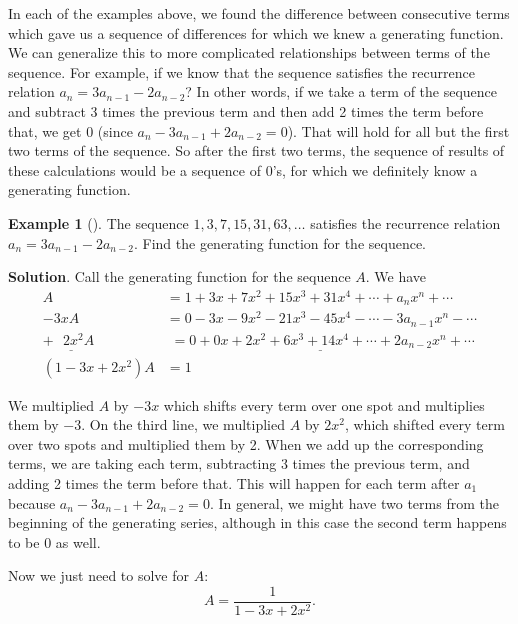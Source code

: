 \documentclass[10pt,]{book}
\theoremstyle{plain}
\theoremstyle{definition}
\theoremstyle{definition}
\newtheorem{example}[theorem]{Example}
\theoremstyle{definition}
\theoremstyle{definition}
\numberwithin{equation}{chapter}
\newcommand{\amp}{&}
\begin{document}
\hypertarget{p-988}{}%
In each of the examples above, we found the difference between consecutive terms which gave us a sequence of differences for which we knew a generating function. We can generalize this to more complicated relationships between terms of the sequence. For example, if we know that the sequence satisfies the recurrence relation \(a_n = 3a_{n-1} - 2a_{n-2}\)? In other words, if we take a term of the sequence and subtract 3 times the previous term and then add 2 times the term before that, we get 0 (since \(a_n - 3a_{n-1} + 2a_{n-2} = 0\)). That will hold for all but the first two terms of the sequence. So after the first two terms, the sequence of results of these calculations would be a sequence of 0's, for which we definitely know a generating function.%
\begin{example}[]\label{example-25}
\hypertarget{p-989}{}%
The sequence \(1, 3, 7, 15, 31, 63, \ldots\) satisfies the recurrence relation \(a_n = 3a_{n-1} - 2a_{n-2}\). Find the generating function for the sequence.%
\par\smallskip%
\noindent\textbf{Solution}.\hypertarget{solution-97}{}\quad%
\hypertarget{p-990}{}%
Call the generating function for the sequence \(A\). We have%
\begin{align*}
A \amp  = 1 + 3x + 7x^2 + 15x^3 + 31x^4 + \cdots + a_nx^n + \cdots\\
-3xA \amp  = 0 - 3x - 9x^2 - 21x^3 - 45x^4 - \cdots - 3a_{n-1}x^n - \cdots\\
\underline{+~~~2x^2A_{~}^{~^{~}}} \amp  \underline{\,\, = 0 + 0x + 2x^2 + 6x^3 + 14x^4 + \cdots + 2a_{n-2}x^n + \cdots}\\
(1-3x+2x^2)A \amp  = 1
\end{align*}
%
\par
\hypertarget{p-991}{}%
We multiplied \(A\) by \(-3x\) which shifts every term over one spot and multiplies them by \(-3\). On the third line, we multiplied \(A\) by \(2x^2\), which shifted every term over two spots and multiplied them by 2. When we add up the corresponding terms, we are taking each term, subtracting 3 times the previous term, and adding 2 times the term before that. This will happen for each term after \(a_1\) because \(a_n - 3a_{n-1} + 2a_{n-2} = 0\). In general, we might have two terms from the beginning of the generating series, although in this case the second term happens to be 0 as well.%
\par
\hypertarget{p-992}{}%
Now we just need to solve for \(A\):%
\begin{equation*}
A = \frac{1}{1 - 3x + 2x^2}.
\end{equation*}
%
\end{example}
\typeout{************************************************}
\typeout{************************************************}
\end{document}
